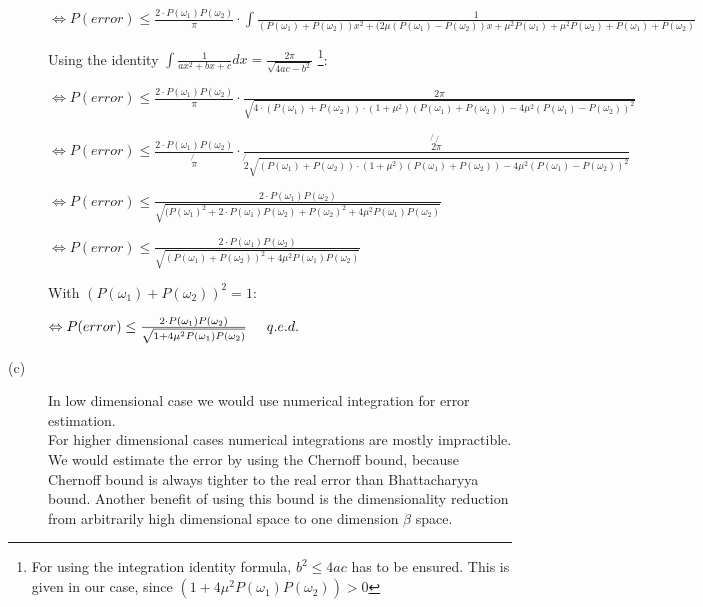 \documentclass{article}
\begin{document}
\begin{description}
$\Leftrightarrow P(error) \leq \frac{2 \cdot P(\omega_1) P(\omega_2)}{\pi} \cdot \int\frac{1}{(P(\omega_1) + P(\omega_2)) x^2 + (2 \mu (P(\omega_1)-P(\omega_2))x + \mu^2 P(\omega_1) + \mu^2 P(\omega_2) + P(\omega_1) + P(\omega_2)}$ 

\vspace{0.3cm}
Using the identity $\int \frac{1}{ax^2 + bx + c} dx = \frac{2 \pi}{\sqrt{4ac-b^2}}$ \footnote[1]{For using the integration identity formula, $b^2 \leq 4ac$ has to be ensured. This is given in our case, since $(1+ 4 \mu^2 P(\omega_1) P(\omega_2)) > 0$}:
\vspace{0.3cm}

$\Leftrightarrow P(error) \leq \frac{2 \cdot P(\omega_1) P(\omega_2)}{\pi} \cdot \frac{2 \pi}{\sqrt{4 \cdot (P(\omega_1) + P(\omega_2)) \cdot (1 + \mu^2) (P(\omega_1)+P(\omega_2)) - 4 \mu^2 (P(\omega_1) - P(\omega_2))^2 }}$ 

$\Leftrightarrow P(error) \leq \frac{2 \cdot P(\omega_1) P(\omega_2)}{\not{\pi}} \cdot \frac{\not{2} \not{\pi}}{\not{2} \sqrt{(P(\omega_1) + P(\omega_2)) \cdot (1 + \mu^2) (P(\omega_1)+P(\omega_2)) - 4 \mu^2 (P(\omega_1) - P(\omega_2))^2 }}$ 

$\Leftrightarrow P(error) \leq \frac{2 \cdot P(\omega_1) P(\omega_2)}{\sqrt{(P(\omega_1)^2 + 2 \cdot P(\omega_1) P(\omega_2) + P(\omega_2)^2 + 4 \mu^2 P(\omega_1) P(\omega_2) }}$ 

$\Leftrightarrow P(error) \leq \frac{2 \cdot P(\omega_1) P(\omega_2)}{\sqrt{(P(\omega_1) + P(\omega_2))^2 + 4 \mu^2 P(\omega_1) P(\omega_2) }}$ 

\vspace{0.3cm}
With $(P(\omega_1) + P(\omega_2))^2 = 1$:
\vspace{0.3cm}

$\Leftrightarrow P(error) \leq \frac{2 \cdot P(\omega_1) P(\omega_2)}{\sqrt{1 + 4 \mu^2 P(\omega_1) P(\omega_2)}} \hspace{0.5cm} q.e.d.$ 



\item[(c)]

In low dimensional case we would use numerical integration for error estimation.\\
For higher dimensional cases numerical integrations are mostly impractible. We would estimate the error by using the Chernoff bound, because Chernoff bound is always tighter to the real error than Bhattacharyya bound. Another benefit of using this bound is the dimensionality reduction from arbitrarily high dimensional space to one dimension $\beta$ space.


\end{description}
\end{document}
